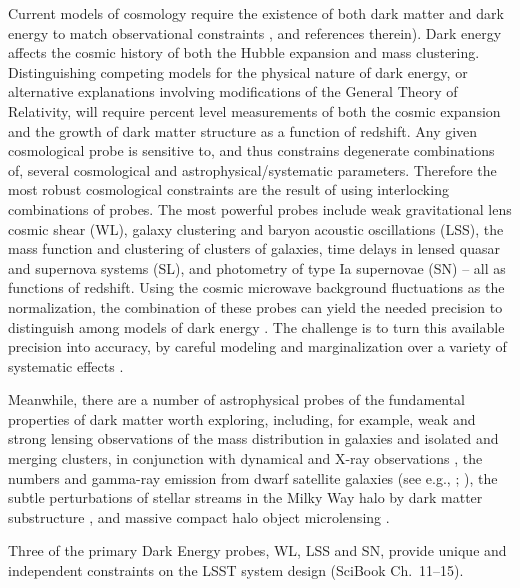Current models of cosmology require the existence of both dark matter and dark
energy to match observational constraints
\citep{2007ApJ...659...98R,2009ApJS..180..330K,2010MNRAS.401.2148P,2012arXiv1211.0310L,2015PNAS..11212249W}, and
references therein). Dark energy affects the cosmic history of both the Hubble expansion
and mass clustering. Distinguishing competing models for the physical
nature of dark energy, or alternative explanations involving
modifications of the General Theory of Relativity, will require
percent level measurements of both the cosmic expansion and the growth
of dark matter structure as a function of redshift.  Any given
cosmological probe is sensitive to, and thus constrains degenerate
combinations of, several cosmological and astrophysical/systematic parameters.  Therefore the most robust
cosmological constraints are the result of using interlocking combinations
of probes. The most powerful probes include weak gravitational lens cosmic shear (WL), galaxy clustering and baryon
acoustic oscillations (LSS), the mass function and clustering of clusters of galaxies,
time delays in lensed quasar and supernova systems (SL),
and photometry of type Ia supernovae (SN) -- all as functions of
redshift. Using the cosmic microwave background fluctuations as the normalization, the
combination of these probes can yield the needed precision to distinguish among models of dark
energy \citep[see e.g.,][and references therein]{2006JCAP...08..008Z}. The challenge is to turn this available precision into accuracy, by careful modeling and marginalization over a variety of systematic effects \citep[see e.g.,][]{2017MNRAS.470.2100K}.

Meanwhile, there are a number of astrophysical probes of the fundamental
properties of dark matter worth exploring, including, for example,
weak and strong lensing observations of the mass distribution in
galaxies and isolated and
merging clusters, in conjunction with dynamical and
X-ray observations \citep[see e.g.,][]{2012ApJ...747L..42D,
2013ApJ...765...24N, 2013MNRAS.430...81R}, the numbers and gamma-ray
emission from dwarf satellite galaxies (see e.g., \citealt{2014ApJ...795L..13H};
\citealt{2015ApJ...809L...4D}),  the subtle perturbations of stellar
streams in the Milky Way halo by dark matter substructure
\citep{2016MNRAS.456..602B}, and massive compact halo object
microlensing \citep{2001ApJ...550L.169A}.

Three of the primary Dark Energy probes, WL, LSS and SN,  provide unique and
independent constraints on the LSST system design (SciBook Ch.~11--15).

